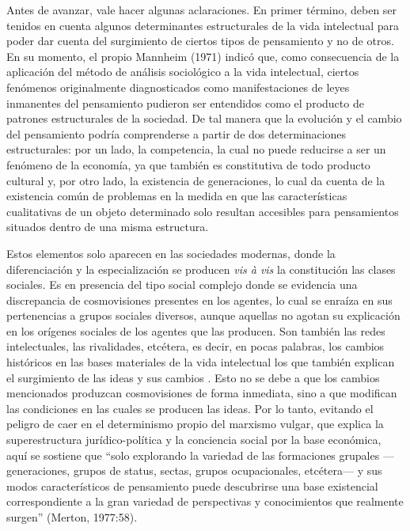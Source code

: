 Antes de avanzar, vale hacer algunas aclaraciones. En primer término, deben ser tenidos en cuenta algunos determinantes estructurales de la vida intelectual para poder dar cuenta del surgimiento de ciertos tipos de pensamiento y no de otros. En su momento, el propio Mannheim (1971) indicó que, como consecuencia de la aplicación del método de análisis sociológico a la vida intelectual, ciertos fenómenos originalmente diagnosticados como manifestaciones de leyes inmanentes del pensamiento pudieron ser entendidos como el producto de patrones estructurales de la sociedad. De tal manera que la evolución y el cambio del pensamiento podría comprenderse a partir de dos determinaciones estructurales: por un lado, la competencia, la cual no puede reducirse a ser un fenómeno de la economía, ya que también es constitutiva de todo producto cultural y, por otro lado, la existencia de generaciones, lo cual da cuenta de la existencia común de problemas en la medida en que las características cualitativas de un objeto determinado solo resultan accesibles para pensamientos situados dentro de una misma estructura.

Estos elementos solo aparecen en las sociedades modernas, donde la diferenciación y la especialización se producen \emph{vis à vis} la constitución las clases sociales. Es en presencia del tipo social complejo donde se evidencia una discrepancia de cosmovisiones presentes en los agentes, lo cual se enraíza en sus pertenencias a grupos sociales diversos, aunque aquellas no agotan su explicación en los orígenes sociales de los agentes que las producen. Son también las redes intelectuales, las rivalidades, etcétera, es decir, en pocas palabras, los cambios históricos en las bases materiales de la vida intelectual los que también explican el surgimiento de las ideas y sus cambios \parencite{1584-COLLINS2000}. Esto no se debe a que los cambios mencionados produzcan cosmovisiones de forma inmediata, sino a que modifican las condiciones en las cuales se producen las ideas. Por lo tanto, evitando el peligro de caer en el determinismo propio del marxismo vulgar, que explica la superestructura jurídico-política y la conciencia social por la base económica, aquí se sostiene que \enquote{solo explorando la variedad de las formaciones grupales ---generaciones, grupos de status, sectas, grupos ocupacionales, etcétera--- y sus modos característicos de pensamiento puede descubrirse una base existencial correspondiente a la gran variedad de perspectivas y conocimientos que realmente surgen} (Merton, 1977:58).

